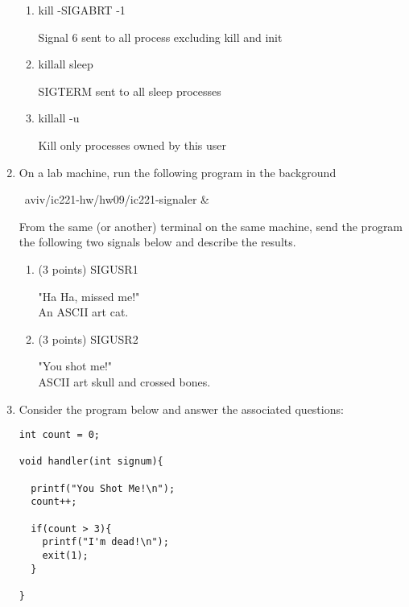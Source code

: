 \documentclass{article}[9pt]
\newenvironment{myanswer}{\begin{mdframed}\begin{answerfont}}{\end{answerfont}\end{mdframed}}
\begin{document}
\begin{enumerate}
\begin{enumerate}
\item kill -SIGABRT -1
\begin{myanswer}
Signal 6 sent to all process excluding kill and init
\end{myanswer}

\item killall sleep
\begin{myanswer}
SIGTERM sent to all sleep processes
\end{myanswer}

\item killall -u
\begin{myanswer}
Kill only processes owned by this user
\end{myanswer}

\end{enumerate}
\item 
On a lab machine, run the following program in the background


~aviv/ic221-hw/hw09/ic221-signaler \&


From the same (or another) terminal on the same machine, send
the program the following two signals below and describe the
results.





\begin{enumerate}
\item (3 points) SIGUSR1
\begin{myanswer}
"Ha Ha, missed me!"\\
An ASCII art cat.
\end{myanswer}

\item (3 points) SIGUSR2
\begin{myanswer}
"You shot me!"\\
ASCII art skull and crossed bones.
\end{myanswer}

\end{enumerate}
\item 
Consider the program below and answer the associated questions:



\begin{lstlisting}
int count = 0;

void handler(int signum){

  printf("You Shot Me!\n");
  count++;

  if(count > 3){
    printf("I'm dead!\n");
    exit(1);
  }

}


\end{lstlisting}
\end{enumerate}
\end{document}
